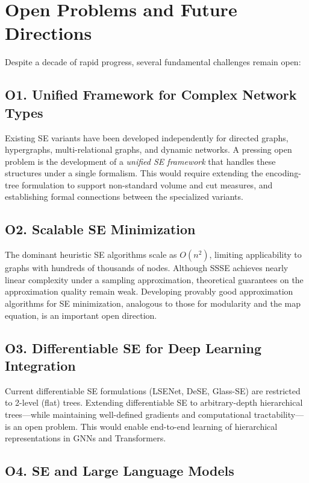 \section{Open Problems and Future Directions}
\label{sec:open}

Despite a decade of rapid progress, several fundamental challenges remain open:

\subsection*{O1. Unified Framework for Complex Network Types}

Existing SE variants have been developed independently for directed graphs,
hypergraphs, multi-relational graphs, and dynamic networks.
A pressing open problem is the development of a \emph{unified SE framework}
that handles these structures under a single formalism.
This would require extending the encoding-tree formulation to support
non-standard volume and cut measures, and establishing formal connections
between the specialized variants.

\subsection*{O2. Scalable SE Minimization}

The dominant heuristic SE algorithms scale as $O(n^2)$, limiting
applicability to graphs with hundreds of thousands of nodes.
Although SSSE achieves nearly linear complexity under a sampling approximation,
theoretical guarantees on the approximation quality remain weak.
Developing provably good approximation algorithms for SE minimization, analogous
to those for modularity and the map equation, is an important open direction.

\subsection*{O3. Differentiable SE for Deep Learning Integration}

Current differentiable SE formulations (LSENet, DeSE, Glass-SE) are restricted
to 2-level (flat) trees.
Extending differentiable SE to arbitrary-depth hierarchical trees---while
maintaining well-defined gradients and computational tractability---is an open
problem.
This would enable end-to-end learning of hierarchical representations in GNNs
and Transformers.

\subsection*{O4. SE and Large Language Models}

